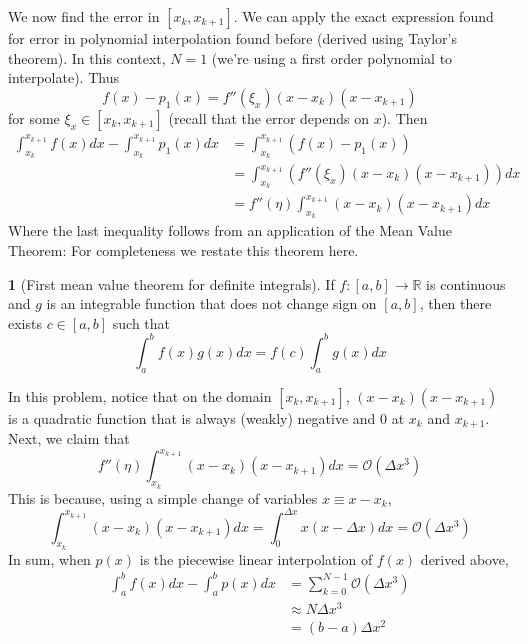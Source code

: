 \documentclass[12pt]{article}
\theoremstyle{definition}
\newtheorem{theorem}{\color{ForestGreen}{\textbf{Theorem}}}
\newcommand{\R}{\mathbb{R}}
\theoremstyle{definition}
\begin{document}
We now find the error in $[x_k, x_{k+1}]$. We can apply the exact expression found for error in polynomial interpolation found before (derived using Taylor's theorem). In this context, $N=1$ (we're using a first order polynomial to interpolate). Thus 
\begin{equation}
	f(x) - p_1(x) = f''(\xi_x)(x - x_k)(x - x_{k+1})
\end{equation}
for some $\xi_x \in [x_k, x_{k+1}]$ (recall that the error depends on $x$). Then
\begin{align*}
	\int_{x_k}^{x_{k+1}} f(x) dx - \int_{x_k}^{x_{k+1}} p_1(x)dx &= \int_{x_k}^{x_{k+1}} ( f(x) - p_1(x)) \\
	&= \int_{x_k}^{x_{k+1}} (f''(\xi_x)(x - x_k)(x - x_{k+1}))dx \\
	&= f''(\eta) \int_{x_k}^{x_{k+1}} (x - x_k)(x - x_{k+1}) dx
\end{align*}
Where the last inequality follows from an application of the Mean Value Theorem: For completeness we restate this theorem here.
\begin{theorem}[First mean value theorem for definite integrals]
	If $f:[a,b] \to \R$ is continuous and $g$ is an integrable function that does not change sign on $[a,b]$, then there exists $c \in [a,b]$ such that
	\begin{equation}
		\int_a^b f(x)g(x) dx = f(c)\int_a^b g(x)dx
	\end{equation}
\end{theorem}
In this problem, notice that on the domain $[x_k, x_{k+1}]$, $(x - x_k)(x - x_{k+1})$ is a quadratic function that is always (weakly) negative and $0$ at $x_k$ and $x_{k+1}$. Next, we claim that
\begin{equation}
	f''(\eta) \int_{x_k}^{x_{k+1}} (x - x_k)(x - x_{k+1}) dx = \mathcal{O}(\Delta x^3)
\end{equation}
This is because, using a simple change of variables $x \equiv x - x_k$,
\begin{equation}
	\int_{x_k}^{x_{k+1}} (x - x_k)(x - x_{k+1}) dx = \int_{0}^{\Delta x} x(x - \Delta x) dx = \mathcal{O}(\Delta x^3)
\end{equation}
In sum, when $p(x)$ is the piecewise linear interpolation of $f(x)$ derived above,
\begin{align*}
	\int_a^b f(x)dx - \int_a^b p(x) dx &= \sum_{k=0}^{N-1} \mathcal{O}(\Delta x^3) \\
	&\approx N \Delta x^3 \\
	&= (b-a) \Delta x^2 \tag{Recall $N\Delta x = b-a$}
\end{align*}
\end{document}
